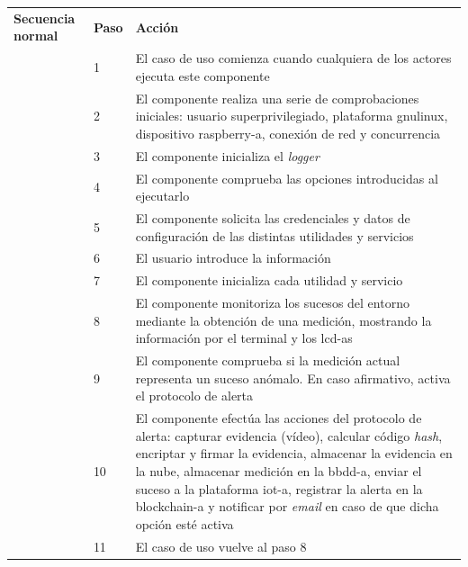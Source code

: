 \documentclass[12pt,a4paper, twoside]{report}
\begin{document}
\begin{longtable}{|p{3cm}|p{1cm}|p{12.5cm}|}
		\multirow{0}{3cm}{\cellcolor{Gainsboro}\textbf{Secuencia normal}} & \textbf{Paso} & \textbf{Acción}  \\ \cline{2-3} 
		\cellcolor{Gainsboro} & 1 & El caso de uso comienza cuando cualquiera de los actores ejecuta este componente \\ \cline{2-3}  
		\cellcolor{Gainsboro} & 2 & El componente realiza una serie de comprobaciones iniciales: usuario superprivilegiado, plataforma \gls{gnulinux}, dispositivo \gls{raspberry-a}, conexión de red y concurrencia \\ \cline{2-3}  
		\cellcolor{Gainsboro} & 3 & El componente inicializa el \textit{logger} \\ \cline{2-3}  
		\cellcolor{Gainsboro} & 4 & El componente comprueba las opciones introducidas al ejecutarlo \\ \cline{2-3}  
		\cellcolor{Gainsboro} & 5 & El componente solicita las credenciales y datos de configuración de las distintas utilidades y servicios \\ \cline{2-3}  
		\cellcolor{Gainsboro} & 6 & El usuario introduce la información \\ \cline{2-3}  
		\cellcolor{Gainsboro} & 7 & El componente inicializa cada utilidad y servicio \\ \cline{2-3}  
		\cellcolor{Gainsboro} & 8 & El componente monitoriza los sucesos del entorno mediante la obtención de una medición, mostrando la información por el terminal y los \glspl{lcd-a} \\ \cline{2-3}  
		\cellcolor{Gainsboro} & 9 & El componente comprueba si la medición actual representa un suceso anómalo. En caso afirmativo, activa el protocolo de alerta \\ \cline{2-3}  
		\cellcolor{Gainsboro} & 10 & El componente efectúa las acciones del protocolo de alerta: capturar evidencia (vídeo), calcular código \textit{hash}, encriptar y firmar la evidencia, almacenar la evidencia en la nube, almacenar medición en la \gls{bbdd-a}, enviar el suceso a la plataforma \gls{iot-a}, registrar la alerta en la \gls{blockchain-a} y notificar por \textit{email} en caso de que dicha opción esté activa \\ \cline{2-3}  	
		\cellcolor{Gainsboro} & 11 & El caso de uso vuelve al paso 8 \\ \hline
		

\end{longtable}
\end{document}
